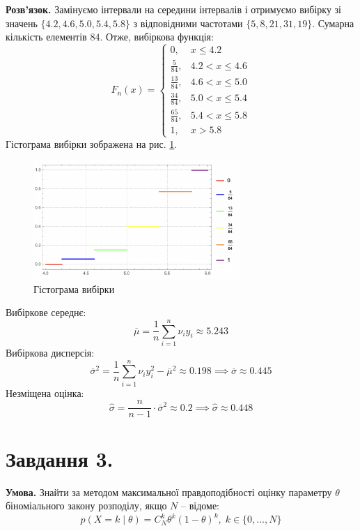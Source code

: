 \documentclass[14pt]{extarticle}
\begin{document}
\textbf{Розв'язок.} Замінуємо інтервали на середини інтервалів і отримуємо вибірку зі значень $\{4.2,4.6,5.0,5.4,5.8\}$ з відповідними частотами $\{5,8,21,31,19\}$. Сумарна кількість елементів $84$. Отже, вибіркова функція:
\[
\hat{F}_n(x) = \begin{cases}
    0, & x \leq 4.2\\
    \frac{5}{84}, & 4.2 < x \leq 4.6 \\
    \frac{13}{84}, & 4.6 < x \leq 5.0 \\
    \frac{34}{84}, & 5.0 < x \leq 5.4 \\
    \frac{65}{84}, & 5.4 < x \leq 5.8 \\
    1, & x > 5.8
\end{cases}
\]
Гістограма вибірки зображена на рис. \ref{fig:1}.
\begin{figure}[H]
    \centering
    \includegraphics[width=0.7\textwidth]{images/hw_11/histogram.png}
    \caption{Гістограма вибірки}
    \label{fig:1}
\end{figure}

Вибіркове середнє:
\[
\overline{\mu} = \frac{1}{n}\sum_{i=1}^n \nu_i y_i \approx 5.243
\]
Вибіркова дисперсія:
\[
\overline{\sigma}^2 = \frac{1}{n}\sum_{i=1}^n \nu_i y_i^2 - \overline{\mu}^2 \approx 0.198 \implies \overline{\sigma} \approx 0.445
\]
Незміщена оцінка:
\[
\hat{\sigma} = \frac{n}{n-1} \cdot \overline{\sigma}^2 \approx 0.2 \implies \hat{\sigma} \approx 0.448
\]

\pagebreak
\section*{Завдання 3.}

\textbf{Умова.} Знайти за методом максимальної правдоподібності оцінку параметру $\theta$ біноміального закону розподілу, якщо $N$ -- відоме:
\[
p(X=k \mid \theta) = C_N^k\theta^k(1-\theta)^k, \; k \in \{0,\dots,N\}
\]
\end{document}
